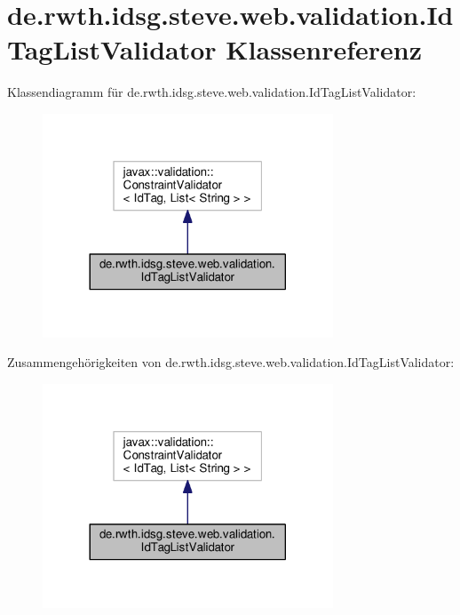 \hypertarget{classde_1_1rwth_1_1idsg_1_1steve_1_1web_1_1validation_1_1_id_tag_list_validator}{\section{de.\+rwth.\+idsg.\+steve.\+web.\+validation.\+Id\+Tag\+List\+Validator Klassenreferenz}
\label{classde_1_1rwth_1_1idsg_1_1steve_1_1web_1_1validation_1_1_id_tag_list_validator}
}


Klassendiagramm für de.\+rwth.\+idsg.\+steve.\+web.\+validation.\+Id\+Tag\+List\+Validator\+:\nopagebreak
\begin{figure}[H]
\begin{center}
\leavevmode
\includegraphics[width=245pt]{classde_1_1rwth_1_1idsg_1_1steve_1_1web_1_1validation_1_1_id_tag_list_validator__inherit__graph}
\end{center}
\end{figure}


Zusammengehörigkeiten von de.\+rwth.\+idsg.\+steve.\+web.\+validation.\+Id\+Tag\+List\+Validator\+:\nopagebreak
\begin{figure}[H]
\begin{center}
\leavevmode
\includegraphics[width=245pt]{classde_1_1rwth_1_1idsg_1_1steve_1_1web_1_1validation_1_1_id_tag_list_validator__coll__graph}
\end{center}
\end{figure}
